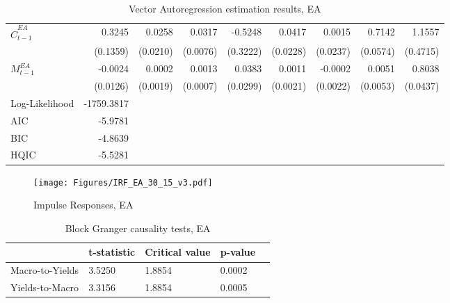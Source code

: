 \begin{sidewaystable}
\begin{tabular}{lrrrrrrrr}
        $\hat{C}^{EA}_{t-1}$          &  0.3245 &   0.0258 &      0.0317 & -0.5248 &  0.0417 &  0.0015 &  0.7142 &    1.1557 \\
               &  (0.1359) &   (0.0210) &      (0.0076) &  (0.3222) &  (0.0228) &  (0.0237) &  (0.0574) &    (0.4715) \\
        $M^{EA}_{t-1}$      & -0.0024 &   0.0002 &      0.0013 &  0.0383 &  0.0011 & -0.0002 &  0.0051 &    0.8038 \\
           &  (0.0126) &   (0.0019) &      (0.0007) &  (0.0299) &  (0.0021) &  (0.0022) &  (0.0053) &    (0.0437) \\
    \midrule
    Log-Likelihood & -1759.3817 \\
    AIC            &    -5.9781 \\
    BIC            &    -4.8639 \\
    HQIC           &    -5.5281 \\
    \bottomrule
    \end{tabular}
    \caption{Vector Autoregression estimation results, EA}
    \label{tab:VAR_output_EA}
\end{sidewaystable}


\begin{sidewaysfigure}
    \centering
    \texttt{[image: Figures/IRF\_EA\_30\_15\_v3.pdf]}
    \caption{Impulse Responses, EA}
    \label{fig:IRF_EA}
\end{sidewaysfigure}



\begin{table}[!t]
    \centering
    \begin{tabular}{lllll}
    \toprule
    {} &     t-statistic &      Critical value &                 p-value 
    \\
    \midrule
    Macro-to-Yields &  3.5250 &  1.8854 &  0.0002 &  \\
    Yields-to-Macro &   3.3156 &  1.8854 &  0.0005  \\
\bottomrule
    \end{tabular}
    \caption{Block Granger causality tests, EA}
    \label{tab:granger_ea}
\end{table}


